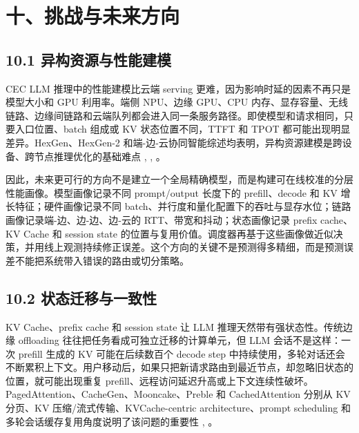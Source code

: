 \section*{十、挑战与未来方向}

\subsection*{10.1 异构资源与性能建模}

CEC LLM 推理中的性能建模比云端 serving 更难，因为影响时延的因素不再只是模型大小和 GPU 利用率。端侧 NPU、边缘 GPU、CPU 内存、显存容量、无线链路、边缘间链路和云端队列都会进入同一条服务路径。即使模型和请求相同，只要入口位置、batch 组成或 KV 状态位置不同，TTFT 和 TPOT 都可能出现明显差异。HexGen、HexGen-2 和端-边-云协同智能综述均表明，异构资源建模是跨设备、跨节点推理优化的基础难点 \cite{jiang2023hexgen}, \cite{jiang2025hexgen}, \cite{duan2022distributed}。

因此，未来更可行的方向不是建立一个全局精确模型，而是构建可在线校准的分层性能画像。模型画像记录不同 prompt/output 长度下的 prefill、decode 和 KV 增长特征；硬件画像记录不同 batch、并行度和量化配置下的吞吐与显存水位；链路画像记录端-边、边-边、边-云的 RTT、带宽和抖动；状态画像记录 prefix cache、KV Cache 和 session state 的位置与复用价值。调度器再基于这些画像做近似决策，并用线上观测持续修正误差。这个方向的关键不是预测得多精细，而是预测误差不能把系统带入错误的路由或切分策略。


\subsection*{10.2 状态迁移与一致性}

KV Cache、prefix cache 和 session state 让 LLM 推理天然带有强状态性。传统边缘 offloading 往往把任务看成可独立迁移的计算单元，但 LLM 会话不是这样：一次 prefill 生成的 KV 可能在后续数百个 decode step 中持续使用，多轮对话还会不断累积上下文。用户移动后，如果只把新请求路由到最近节点，却忽略旧状态的位置，就可能出现重复 prefill、远程访问延迟升高或上下文连续性破坏。PagedAttention、CacheGen、Mooncake、Preble 和 CachedAttention 分别从 KV 分页、KV 压缩/流式传输、KVCache-centric architecture、prompt scheduling 和多轮会话缓存复用角度说明了该问题的重要性 \cite{kwon2023efficient}, \cite{qin2025mooncake,liu2024cachegen,srivatsa2025preble,gao2024cost}。

